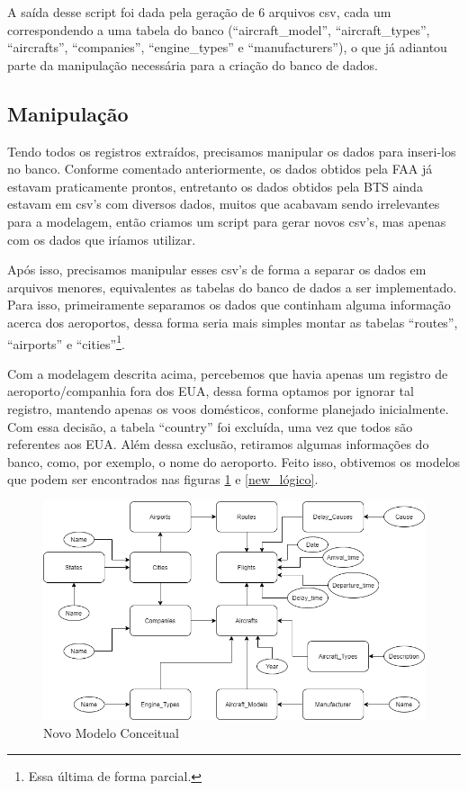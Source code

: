 \documentclass{article}
\begin{document}
	A saída desse script foi dada pela geração de 6 arquivos csv, cada um correspondendo a uma tabela do banco (``aircraft\_model'', ``aircraft\_types'', ``aircrafts'', ``companies'', ``engine\_types'' e ``manufacturers''), o que já adiantou parte da manipulação necessária para a criação do banco de dados.
	
	\subsection{Manipulação}
	
	Tendo todos os registros extraídos, precisamos manipular os dados para inseri-los no banco. Conforme comentado anteriormente, os dados obtidos pela FAA já estavam praticamente prontos, entretanto os dados obtidos pela BTS ainda estavam em csv's com diversos dados, muitos que acabavam sendo irrelevantes para a modelagem, então criamos um script para gerar novos csv's, mas apenas com os dados que iríamos utilizar.
	
	Após isso, precisamos manipular esses csv's de forma a separar os dados em arquivos menores, equivalentes as tabelas do banco de dados a ser implementado. Para isso, primeiramente separamos os dados que continham alguma informação acerca dos aeroportos, dessa forma seria mais simples montar as tabelas ``routes'', ``airports'' e ``cities''\footnote{Essa última de forma parcial.}.
	
	Com a modelagem descrita acima, percebemos que havia apenas um registro de aeroporto/companhia fora dos EUA, dessa forma optamos por ignorar tal registro, mantendo apenas os voos domésticos, conforme planejado inicialmente. Com essa decisão, a tabela ``country'' foi excluída, uma vez que todos são referentes aos EUA. Além dessa exclusão, retiramos algumas informações do banco, como, por exemplo, o nome do aeroporto. Feito isso, obtivemos os modelos que podem ser encontrados nas figuras \ref{new_conceitual} e \ref{new_lógico}.
	\begin{figure}
		\centering
		\includegraphics[scale = 0.5]{Imagens/modelo conceitual.png}
		\caption{Novo Modelo Conceitual}
		\label{new_conceitual}
	\end{figure}
	
\end{document}
